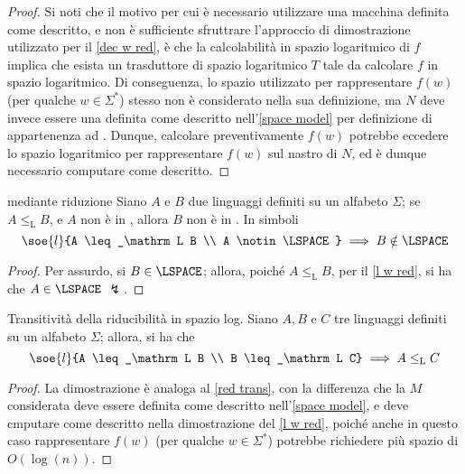 \documentclass[a4paper, 12pt]{report}
\begin{document}
\begin{proof}
        Si noti che il motivo per cui è necessario utilizzare una macchina definita come descritto, e non è sufficiente sfruttrare l'approccio di dimostrazione utilizzato per il \cref{dec w red}, è che la calcolabilità in spazio logaritmico di $f$ implica che esista un trasduttore di spazio logaritmico $T$ tale da calcolare $f$ in spazio logaritmico. Di conseguenza, lo spazio utilizzato per rappresentare $f(w)$ (per qualche $w \in \Sigma^*$) stesso non è considerato nella sua definizione, ma $N$ deve invece essere una \TM definita come descritto nell'\cref{space model} per definizione di appartenenza ad \LSPACE. Dunque, calcolare preventivamente $f(w)$ potrebbe eccedere lo spazio logaritmico per rappresentare $f(w)$ sul nastro di $N$, ed è dunque necessario computare come descritto.
    \end{proof}

    \begin{framedcor}{\LSPACE mediante riduzione}
        Siano $A$ e $B$ due linguaggi definiti su un alfabeto $\Sigma$; se $A \leq_\mathrm L B$, e $A$ non è in \LSPACE, allora $B$ non è in \LSPACE. In simboli $$\soe{l}{A \leq_\mathrm L B \\ A \notin \LSPACE} \implies B \notin \LSPACE$$
    \end{framedcor}

    \begin{proof}
        Per assurdo, si $B \in \LSPACE$; allora, poiché $A \leq_\mathrm L B$, per il \cref{l w red}, si ha che $A \in \LSPACE$ $\lightning$.
    \end{proof}

    \begin{framedlem}[label={l red trans}]{Transitività della riducibilità in spazio log.}
        Siano $A, B$ e $C$ tre linguaggi definiti su un alfabeto $\Sigma$; allora, si ha che $$\soe{l}{A \leq_\mathrm L B \\ B \leq_\mathrm L C} \implies A \leq_\mathrm L C$$
    \end{framedlem}

    \begin{proof}
        La dimostrazione è analoga al \cref{red trans}, con la differenza che la \TM $M$ considerata deve essere definita come descritto nell'\cref{space model}, e deve cmputare come descritto nella dimostrazione del \cref{l w red}, poiché anche in questo caso rappresentare $f(w)$ (per qualche $w \in \Sigma^*$) potrebbe richiedere più spazio di $O(\log(n))$.
    \end{proof}
\end{document}
